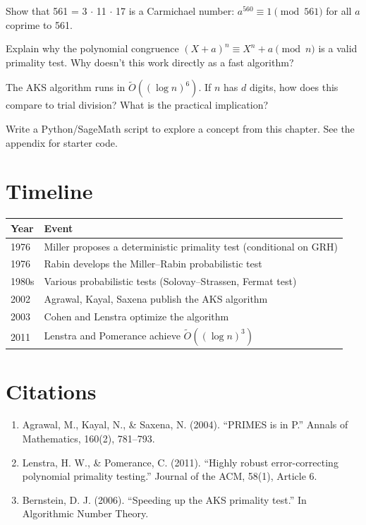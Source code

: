 \begin{exercise}[Intermediate]
Show that 561 = 3 $\cdot$ 11 $\cdot$ 17 is a Carmichael number: $a^{560} \equiv 1 \pmod{561}$ for all $a$ coprime to 561.
\end{exercise}

\begin{exercise}[Challenge]
Explain why the polynomial congruence $(X+a)^n \equiv X^n + a \pmod{n}$ is a valid primality test. Why doesn't this work directly as a fast algorithm?
\end{exercise}

\begin{exercise}
The AKS algorithm runs in $\tilde{O}((\log n)^6)$. If $n$ has $d$ digits, how does this compare to trial division? What is the practical implication?
\end{exercise}


\begin{exercise}[Computational]
Write a Python/SageMath script to explore a concept from this chapter. See the appendix for starter code.
\end{exercise}

\section{Timeline}

\begin{tabularx}{\linewidth}{lX}
\toprule
\textbf{Year} & \textbf{Event} \\ \midrule
1976 & Miller proposes a deterministic primality test (conditional on GRH) \\ 
1976 & Rabin develops the Miller--Rabin probabilistic test \\ 
1980s & Various probabilistic tests (Solovay--Strassen, Fermat test) \\ 
2002 & Agrawal, Kayal, Saxena publish the AKS algorithm \cite{agrawal2004} \\ 
2003 & Cohen and Lenstra optimize the algorithm \cite{bernstein2006} \\ 
2011 & Lenstra and Pomerance achieve $\tilde{O}((\log n)^3)$ \cite{lenstra2011} \\ \bottomrule
\end{tabularx}

\section{Citations}

\begin{enumerate}
\item Agrawal, M., Kayal, N., \& Saxena, N. (2004). ``PRIMES is in P.'' Annals of Mathematics, 160(2), 781--793.
\item Lenstra, H. W., \& Pomerance, C. (2011). ``Highly robust error-correcting polynomial primality testing.'' Journal of the ACM, 58(1), Article 6.
\item Bernstein, D. J. (2006). ``Speeding up the AKS primality test.'' In Algorithmic Number Theory.
\end{enumerate}

